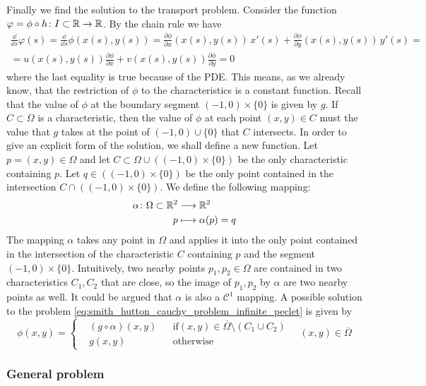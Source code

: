 Finally we find the solution to the transport problem. Consider the function $\varphi = \phi \circ h \colon I \subset \mathbb{R} \to \mathbb{R}$. By the chain rule we have
\begin{multline}
	\frac{\dd}{\dd{s}} \varphi(s) = 
	\frac{\dd}{\dd{s}} \phi(x(s), y(s)) = 
	\frac{\partial \phi}{\partial x} (x(s), y(s)) \, x'(s) + 
	\frac{\partial \phi}{\partial y} (x(s), y(s)) \, y'(s) = \\ =
	u(x(s),y(s)) \frac{\partial \phi}{\partial x} + 
	v(x(s),y(s)) \frac{\partial \phi}{\partial y} = 0
\end{multline}
where the last equality is true because of the PDE. This means, as we already know, that the restriction of $\phi$ to the characteristics is a constant function. Recall that the value of $\phi$ at the boundary segment $(-1,0) \times \{ 0 \}$ is given by $g$. If $C \subset \Omega$ is a characteristic, then the value of $\phi$ at each point $(x,y) \in C$ must the value that $g$ takes at the point of $(-1,0) \cup \{ 0 \}$ that $C$ intersects. In order to give an explicit form of the solution, we shall define a new function. Let $p = (x,y) \in \Omega$ and let $C \subset \Omega \cup ((-1,0) \times \{ 0 \})$ be the only characteristic containing $p$. Let $q \in ((-1,0) \times \{ 0 \})$ be the only point contained in the intersection $C \cap ((-1,0) \times \{ 0 \})$. We define the following mapping:
\begin{equation}
	\begin{aligned}
		\alpha \colon \Omega \subset \mathbb{R}^2 &\longrightarrow \mathbb{R}^2 \\
		p &\longmapsto \alpha(p) = q
	\end{aligned}
\end{equation}
The mapping $\alpha$ takes any point in $\Omega$ and applies it into the only point contained in the intersection of the characteristic $C$ containing $p$ and the segment $(-1,0) \times \{ 0 \}$. Intuitively, two nearby points $p_1, p_2 \in \Omega$ are contained in two characteristics $C_1, C_2$ that are close, so the image of $p_1, p_2$ by $\alpha$ are two nearby points as well. It could be argued that $\alpha$ is also a $\mathcal{C}^1$ mapping. A possible solution to the problem \eqref{eq:smith_hutton_cauchy_problem_infinite_peclet} is given by
\begin{equation}
	\phi(x,y) = 
	\left\{
	\begin{aligned}
		&(g \circ \alpha)(x,y) & &\text{if} (x,y) \in \overline{\Omega} \setminus (C_1 \cup C_2) \\
		&g(x,y) & &\text{otherwise}
	\end{aligned}
	\right.
	\quad (x,y) \in \overline{\Omega}
\end{equation}

\subsubsection{General problem}
